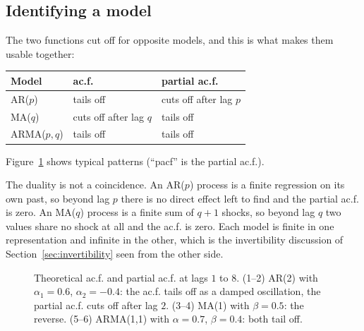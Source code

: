 \documentclass[11pt,a4paper]{article}
\theoremstyle{definition}
\begin{document}
\subsection{Identifying a model}
The two functions cut off for opposite models, and this is what makes them usable together:
\begin{center}
\begin{tabular}{lll}
Model & ac.f. & partial ac.f. \\
\hline
AR($p$) & tails off & cuts off after lag $p$ \\
MA($q$) & cuts off after lag $q$ & tails off \\
ARMA($p, q$) & tails off & tails off \\
\end{tabular}
\end{center}
Figure~\ref{fig:identification} shows typical patterns (``pacf'' is the partial ac.f.).

The duality is not a coincidence. An AR($p$) process is a finite regression on its own past, so beyond lag $p$ there is
no direct effect left to find and the partial ac.f. is zero. An MA($q$) process is a finite sum of $q + 1$ shocks, so beyond
lag $q$ two values share no shock at all and the ac.f. is zero. Each model is finite in one representation and
infinite in the other, which is the invertibility discussion of Section~\ref{sec:invertibility} seen from the other side.

\begin{figure}[H]
\centering
{}
\caption{Theoretical ac.f. and partial ac.f. at lags $1$ to $8$. (1--2) AR(2) with $\alpha_1 = 0.6$, $\alpha_2 = -0.4$: the ac.f. tails off as a damped
oscillation, the partial ac.f. cuts off after lag $2$. (3--4) MA(1) with $\beta = 0.5$: the reverse. (5--6) ARMA(1,1) with $\alpha = 0.7$,
$\beta = 0.4$: both tail off.}
\label{fig:identification}
\end{figure}
\end{document}
